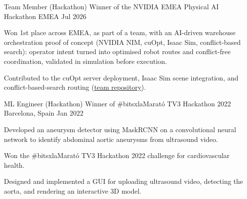 

\begin{cventries}

    \cventry
    {Team Member (Hackathon)}
    {Winner of the NVIDIA EMEA Physical AI Hackathon}
    {EMEA}
    {Jul 2026}
    {
        \begin{cvitems}
            \item{Won 1st place across EMEA, as part of a team, with an AI-driven warehouse orchestration proof of concept (NVIDIA NIM, cuOpt, Isaac Sim, conflict-based search): operator intent turned into optimised robot routes and conflict-free coordination, validated in simulation before execution.}
            \item{Contributed to the cuOpt server deployment, Isaac Sim scene integration, and conflict-based-search routing (\href{https://github.com/Wess2s/team_D_pai}{team repository}).}
        \end{cvitems}
    }

    \vspace{3mm}
    \cventry
    {ML Engineer (Hackathon)}
    {Winner of \#bitsxlaMarató TV3 Hackathon 2022}
    {Barcelona, Spain}
    {Jan 2022}
    {
        \begin{cvitems}
            \item{Developed an aneurysm detector using MaskRCNN on a convolutional neural network to identify abdominal aortic aneurysms from ultrasound video.}
            \item{Won the \#bitsxlaMarató TV3 Hackathon 2022 challenge for cardiovascular health.}
            \item{Designed and implemented a GUI for uploading ultrasound video, detecting the aorta, and rendering an interactive 3D model.}
        \end{cvitems}
    }

\end{cventries}
